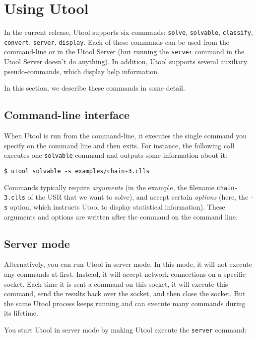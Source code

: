 \section{Using Utool}  \label{sec:operations}

In the current release, Utool supports six commands: \verb?solve?,
\verb?solvable?, \verb?classify?, \verb?convert?, \verb?server?,
\verb?display?. Each of these commands can be used from the
command-line or in the Utool Server (but running the \verb?server?
command in the Utool Server doesn't do anything). In addition, Utool
supports several auxiliary pseudo-commands, which display help
information. 

In this section, we describe these commands in some detail.


\subsection{Command-line interface}
When Utool is run from the command-line, it executes the single
command you specify on the command line and then exits. For instance,
the following call executes one \verb?solvable? command and outputs
some information about it:

\begin{verbatim}
$ utool solvable -s examples/chain-3.clls
\end{verbatim}

Commands typically require \emph{arguments} (in the example, the
filename \verb?chain-3.clls? of the USR that we want to solve), and
accept certain \emph{options} (here, the \verb?-s? option, which
instructs Utool to display statistical information). These arguments
and options are written after the command on the command line.


\subsection{Server mode} \label{sec:operations-server}

Alternatively, you can run Utool in server mode. In this mode, it will
not execute any commands at first. Instead, it will accept network
connections on a specific socket. Each time it is sent a command on
this socket, it will execute this command, send the results back over
the socket, and then close the socket. But the same Utool process
keeps running and can execute many commands during its lifetime. 

You start Utool in server mode by making Utool execute the
\verb?server? command:

